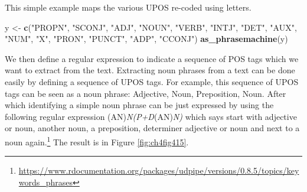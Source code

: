 \documentclass[
]{article}
\newenvironment{Shaded}{\begin{snugshade}}{\end{snugshade}}
\newcommand{\AttributeTok}[1]{\textcolor[rgb]{0.13,0.29,0.53}{#1}}
\newcommand{\ConstantTok}[1]{\textcolor[rgb]{0.56,0.35,0.01}{#1}}
\newcommand{\DecValTok}[1]{\textcolor[rgb]{0.00,0.00,0.81}{#1}}
\newcommand{\FunctionTok}[1]{\textcolor[rgb]{0.13,0.29,0.53}{\textbf{#1}}}
\newcommand{\NormalTok}[1]{#1}
\newcommand{\OtherTok}[1]{\textcolor[rgb]{0.56,0.35,0.01}{#1}}
\newcommand{\SpecialCharTok}[1]{\textcolor[rgb]{0.81,0.36,0.00}{\textbf{#1}}}
\newcommand{\StringTok}[1]{\textcolor[rgb]{0.31,0.60,0.02}{#1}}
\begin{document}
This simple example maps the various UPOS re-coded using letters.

\footnotesize

\begin{Shaded}
\begin{Highlighting}[]
\NormalTok{y }\OtherTok{\textless{}{-}} \FunctionTok{c}\NormalTok{(}\StringTok{"PROPN"}\NormalTok{, }\StringTok{"SCONJ"}\NormalTok{, }\StringTok{"ADJ"}\NormalTok{, }\StringTok{"NOUN"}\NormalTok{, }\StringTok{"VERB"}\NormalTok{, }\StringTok{"INTJ"}\NormalTok{, }\StringTok{"DET"}\NormalTok{, }\StringTok{"AUX"}\NormalTok{, }\StringTok{"NUM"}\NormalTok{, }\StringTok{"X"}\NormalTok{, }\StringTok{"PRON"}\NormalTok{, }\StringTok{"PUNCT"}\NormalTok{, }\StringTok{"ADP"}\NormalTok{, }\StringTok{"CCONJ"}\NormalTok{)}
\FunctionTok{as\_phrasemachine}\NormalTok{(y)}
\end{Highlighting}
\end{Shaded}

\normalsize

We then define a regular expression to indicate a sequence of POS tags which we want to extract from the text. Extracting noun phrases from a text can be done easily by defining a sequence of UPOS tags. For example, this sequence of UPOS tags can be seen as a noun phrase: Adjective, Noun, Preposition, Noun. After which identifying a simple noun phrase can be just expressed by using the following regular expression (A\textbar N)\emph{N(P+D}(A\textbar N)\emph{N)} which says start with adjective or noun, another noun, a preposition, determiner adjective or noun and next to a noun again.\footnote{\url{https://www.rdocumentation.org/packages/udpipe/versions/0.8.5/topics/keywords_phrases}} The result is in Figure \ref{fig:ch4fig415}.

\begin{Shaded}
\end{Shaded}
\end{document}
